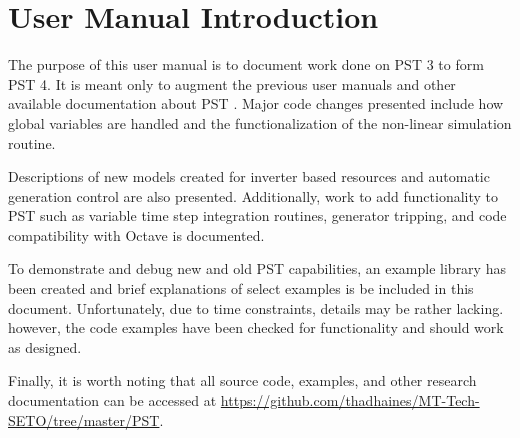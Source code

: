 \vspace{2em} %
\chapter*{User Manual Introduction}

The purpose of this user manual is to document work done on PST 3 to form PST 4. 
It is meant only to augment the previous user manuals and other available documentation about \mbox{PST} \cite{chow1992, PST2LFTut, PST3manual, chow2015}.
%
Major code changes presented include 
how global variables are handled
and the
functionalization of the non-linear simulation routine.

\vspace{1em}
Descriptions of new models created for
inverter based resources
and
automatic generation control
are also presented.
Additionally, work to add functionality to PST such as
variable time step integration routines,
generator tripping, %
and
code compatibility with Octave
is documented.



\vspace{1em}
To demonstrate and debug new and old PST capabilities, an example library has been created and brief explanations of select examples is be included in this document.
Unfortunately, due to time constraints, details may be rather lacking.
however,  the code examples have been checked for functionality and should work as designed.


\vspace{1em}
Finally, it is worth noting that all source code, examples, and other research documentation can be accessed at 
\href{https://github.com/thadhaines/MT-Tech-SETO/tree/master/PST}{https://github.com/thadhaines/MT-Tech-SETO/tree/master/PST}.